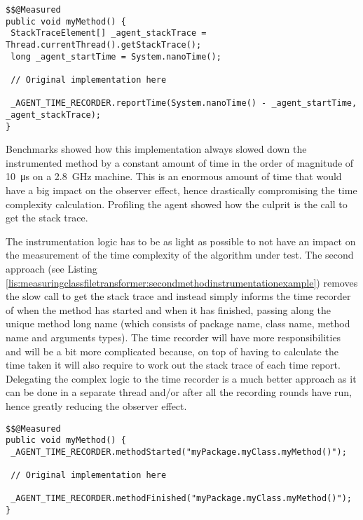 \noindent\begin{minipage}[c]{\linewidth}
\begin{lstlisting}[breaklines,caption={Method instrumentation example (first approach)},label=lis:measuringclassfiletransformer:firstmethodinstrumentationexample]
$$@Measured
public void myMethod() {
 StackTraceElement[] _agent_stackTrace = Thread.currentThread().getStackTrace();
 long _agent_startTime = System.nanoTime();

 // Original implementation here

 _AGENT_TIME_RECORDER.reportTime(System.nanoTime() - _agent_startTime, _agent_stackTrace);
}
\end{lstlisting}
\end{minipage}

\noindent Benchmarks showed how this implementation always slowed down the instrumented method by a constant amount of time in the order of magnitude of \SI{10}{\micro\second} on a \SI{2.8}{\giga\hertz} machine. This is an enormous amount of time that would have a big impact on the observer effect, hence drastically compromising the time complexity calculation. Profiling the agent showed how the culprit is the call to get the stack trace.

\noindent The instrumentation logic has to be as light as possible to not have an impact on the measurement of the time complexity of the algorithm under test. The second approach (see Listing \ref{lis:measuringclassfiletransformer:secondmethodinstrumentationexample}) removes the slow call to get the stack trace and instead simply informs the time recorder of when the method has started and when it has finished, passing along the unique method long name (which consists of package name, class name, method name and arguments types). The time recorder will have more responsibilities and will be a bit more complicated because, on top of having to calculate the time taken it will also require to work out the stack trace of each time report. Delegating the complex logic to the time recorder is a much better approach as it can be done in a separate thread and/or after all the recording rounds have run, hence greatly reducing the observer effect.

\noindent\begin{minipage}[c]{\linewidth}
\begin{lstlisting}[breaklines,caption={Method instrumentation example (second approach)},label=lis:measuringclassfiletransformer:secondmethodinstrumentationexample]
$$@Measured
public void myMethod() {
 _AGENT_TIME_RECORDER.methodStarted("myPackage.myClass.myMethod()");

 // Original implementation here

 _AGENT_TIME_RECORDER.methodFinished("myPackage.myClass.myMethod()");
}
\end{lstlisting}
\end{minipage}


